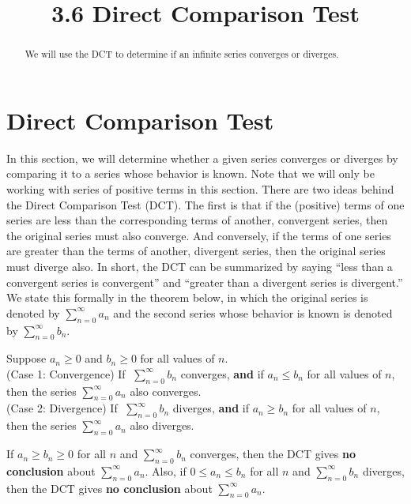 \documentclass[handout]{ximera}
\title{3.6 Direct Comparison Test}
\begin{document}
\begin{abstract}
We will use the DCT to determine if an infinite series converges or diverges.
\end{abstract}

\maketitle

\section{Direct Comparison Test}

In this section, we will determine whether a given series converges or diverges by comparing it to a series whose behavior is known.
Note that we will only be working with series of positive terms in this section. There are two ideas behind the Direct Comparison Test (DCT).
The first is that if the (positive) terms of one series are less than the corresponding terms of another, 
convergent series, then the original series must also converge. And conversely, if the terms of one series are greater than 
the terms of another, divergent series, then the original series must diverge also.
In short, the DCT can be summarized by saying ``less than a convergent series is convergent''
and ``greater than a divergent series is divergent.''
We state this formally in the theorem below, in which the original series is denoted by $\displaystyle{\sum_{n=0}^\infty a_n}$ 
and the second series whose behavior is known is denoted by $\displaystyle{\sum_{n=0}^\infty b_n}$.


\begin{theorem}
 Suppose $a_n \geq 0$ and $b_n \geq 0$ for all values of $n$.\\
(Case 1: Convergence) If $\; \displaystyle{\sum_{n=0}^\infty b_n}$ converges, \textbf{and} if $a_n \leq b_n$ for all values of $n$,  
then the series $\displaystyle{\sum_{n=0}^\infty a_n}$ also converges.\\
(Case 2: Divergence) If $\; \displaystyle{\sum_{n=0}^\infty b_n}$ diverges, \textbf{and} if $a_n \geq b_n$ for all values of $n$,  
then the series $\displaystyle{\sum_{n=0}^\infty a_n}$ also diverges.
\end{theorem}


\begin{remark}
If \; $a_n \geq b_n \geq 0$ for all $n$ and $\displaystyle{\sum_{n=0}^\infty b_n}$ converges, then the DCT gives \textbf{no conclusion} about $\displaystyle{\sum_{n=0}^\infty a_n}$.
Also, if \; $0 \leq a_n \leq b_n$ for all $n$ and $\displaystyle{\sum_{n=0}^\infty b_n}$ diverges, then the DCT gives \textbf{no conclusion} about $\displaystyle{\sum_{n=0}^\infty a_n}$.
\end{remark}
\end{document}
